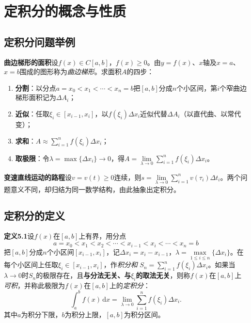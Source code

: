 
\section{定积分的概念与性质}

\subsection{定积分问题举例}

\noindent\textbf{曲边梯形的面积}\quad 设$f(x)\in C[a,b]$，$f(x)\ge0$。由$y=f(x)$、$x$轴及$x=a$、$x=b$围成的图形称为\emph{曲边梯形}。求面积$A$的四步：
\begin{enumerate}
  \item \textbf{分割}：以分点$a=x_0<x_1<\cdots<x_n=b$把$[a,b]$分成$n$个小区间，第$i$个窄曲边梯形面积记为$\Delta A_i$；
  \item \textbf{近似}：任取$\xi_i\in[x_{i-1},x_i]$，以$f(\xi_i)\Delta x_i$近似代替$\Delta A_i$（以直代曲、以常代变）；
  \item \textbf{求和}：$A\approx\sum\limits_{i=1}^{n}f(\xi_i)\Delta x_i$；
  \item \textbf{取极限}：令$\lambda=\max\{\Delta x_i\}\to0$，得$A=\lim\limits_{\lambda\to0}\sum\limits_{i=1}^{n}f(\xi_i)\Delta x_i$。
\end{enumerate}

\noindent\textbf{变速直线运动的路程}\quad 设$v=v(t)\ge0$连续，则$s=\lim\limits_{\lambda\to0}\sum\limits_{i=1}^{n}v(\tau_i)\Delta t_i$。两个问题意义不同，却归结为同一数学结构，由此抽象出定积分。

\subsection{定积分的定义}

\noindent\textbf{定义5.1}\quad 设$f(x)$在$[a,b]$上有界，用分点
\[
a=x_0<x_1<x_2<\cdots<x_{i-1}<x_i<\cdots<x_n=b
\]
把$[a,b]$分成$n$个小区间$[x_{i-1},x_i]$，记$\Delta x_i=x_i-x_{i-1}$，$\lambda=\max\limits_{1\le i\le n}\{\Delta x_i\}$。在每个小区间上任取$\xi_i\in[x_{i-1},x_i]$，作\emph{积分和}
$S_n=\sum\limits_{i=1}^{n}f(\xi_i)\Delta x_i$。如果当$\lambda\to0$时$S_n$的极限存在，且\textbf{与分法无关、与$\xi_i$的取法无关}，则称$f(x)$在$[a,b]$上\emph{可积}，并称此极限为$f(x)$在$[a,b]$上的\emph{定积分}：
\[
\int_a^b f(x)\,\mathrm{d}x=\lim_{\lambda\to0}\sum_{i=1}^{n}f(\xi_i)\Delta x_i .
\]
其中$a$为积分下限，$b$为积分上限，$[a,b]$为积分区间。

